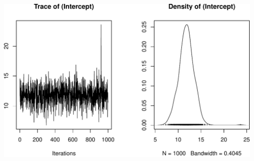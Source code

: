 \documentclass[11pt,ignorenonframetext,]{beamer}
\newenvironment{Shaded}{}{}
\newcommand{\KeywordTok}[1]{\textcolor[rgb]{0.00,0.44,0.13}{\textbf{#1}}}
\newcommand{\StringTok}[1]{\textcolor[rgb]{0.25,0.44,0.63}{#1}}
\newcommand{\OperatorTok}[1]{\textcolor[rgb]{0.40,0.40,0.40}{#1}}
\newcommand{\NormalTok}[1]{#1}
\let\oldShaded\Shaded
\let\endoldShaded\endShaded
\renewenvironment{Shaded}{\footnotesize\begin{spacing}{0.9}\oldShaded}{\endoldShaded\end{spacing}}
\begin{document}
\begin{frame}[fragile]{}

\begin{Shaded}
\end{Shaded}

\includegraphics{Lec20_files/figure-beamer/unnamed-chunk-23-1.pdf}

\end{frame}
\end{document}
